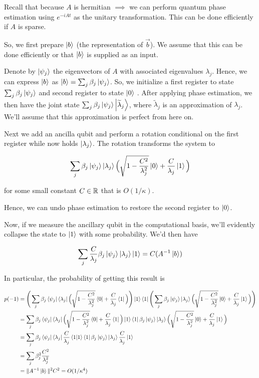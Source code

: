 \documentclass[main.tex]{subfiles}
\begin{document}
{Recall that because $A$ is hermitian $\implies$ we can perform quantum phase estimation using $e^{-iAt}$ as the unitary transformation. This can be done efficiently if $A$ is sparse.

So, we first prepare $\ket{b}$ (the representation of $\vec{b}$). We assume that this can be done efficiently or that $\ket{b}$ is supplied as an input.

Denote by $\ket{\psi_j}$ the eigenvectors of $A$ with associated eigenvalues $\lambda_j$. Hence, we can express $\ket{b}$ as $\ket{b} = \sum_j \beta_j \ket{\psi_j}$.  So, we initialize a first register to state $\sum_j \beta_j \ket{\psi_j}$ and second register to state $\ket{0}$ . After applying phase estimation, we then have the joint state $\sum_j \beta_j \ket{\psi_j} \ket{\widetilde{\lambda}_j}$, where $\widetilde{\lambda}_j$ is an approximation of $\lambda_j$. We'll assume that this approximation is perfect from here on. 

Next we add an ancilla qubit and perform a rotation conditional on the first register while now holds $\ket{\lambda_j}$. The rotation transforms the system to

\begin{align*}
\sum_j \beta_j \ket{\psi_j} \ket{\lambda_j} \Big(\sqrt{1-\frac{C^2}{\lambda_j^2}}\ket{0} + \frac{C}{\lambda_j}\ket{1}\Big)
\end{align*}

for some small constant $C \in \mathbb{R}$ that is $O(1/\kappa)$.

Hence, we can undo phase estimation to restore the second register to $\ket{0}$.

Now, if we measure the ancillary qubit in the computational basis, we'll evidently collapse the state to $\ket{1}$ with some probability. We'd then have

\begin{align*}
	\sum_j \frac{C}{\lambda_j} \beta_j \ket{\psi_j} \ket{\lambda_j}\ket{1} = C (A^{-1} \ket{b})
\end{align*}

In particular, the probability of getting this result is 

\begin{align*} 
	p(-1) &= \Bigg(\sum_j \beta_j \bra{\psi_j} \bra{\lambda_j} \Big(\sqrt{1-\frac{C^2}{\lambda_j^2}}\bra{0} + \frac{C}{\lambda_j}\bra{1}\Big) \Bigg)\ket{1}\bra{1} \Bigg(\sum_j \beta_j \ket{\psi_j} \ket{\lambda_j} \Big(\sqrt{1-\frac{C^2}{\lambda_j^2}}\ket{0} + \frac{C}{\lambda_j}\ket{1}\Big)\Bigg) \\
	&= \sum_j \beta_j \bra{\psi_j} \bra{\lambda_j} \Big(\sqrt{1-\frac{C^2}{\lambda_j^2}}\bra{0} + \frac{C}{\lambda_j}\bra{1}\Big) \ket{1}\bra{1} \beta_j \ket{\psi_j} \ket{\lambda_j} \Big(\sqrt{1-\frac{C^2}{\lambda_j^2}}\ket{0} + \frac{C}{\lambda_j}\ket{1}\Big) \\
	&= \sum_j \beta_j \bra{\psi_j} \bra{\lambda_j} \frac{C}{\lambda_j}\bra{1}\ket{1}\bra{1} \beta_j \ket{\psi_j} \ket{\lambda_j} \frac{C}{\lambda_j}\ket{1} \\
	&= \sum_j \beta_j^2 \frac{C^2}{\lambda_j^2} \\
	&= \| A^{-1} \ket{b} \|^2 C^2 = O(1/\kappa^4)
\end{align*} 

}
\end{document}

